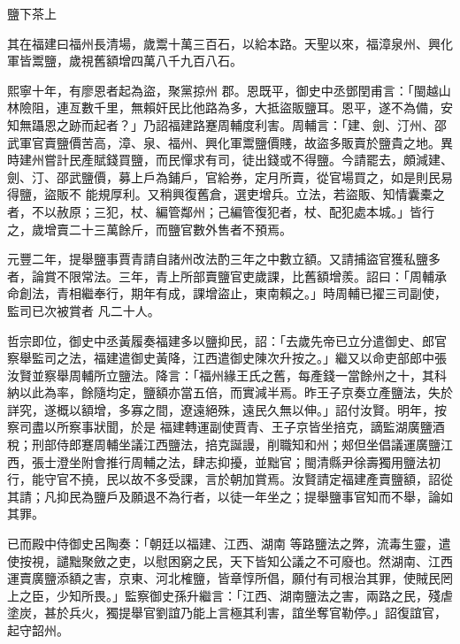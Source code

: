 
\begin{pinyinscope}

 鹽下茶上



 其在福建曰福州長清場，歲鬻十萬三百石，以給本路。天聖以來，福漳泉州、興化軍皆鬻鹽，歲視舊額增四萬八千九百八石。



 熙寧十年，有廖恩者起為盜，聚黨掠州
 郡。恩既平，御史中丞鄧閏甫言：「閩越山林險阻，連亙數千里，無賴奸民比他路為多，大抵盜販鹽耳。恩平，遂不為備，安知無躡恩之跡而起者？」乃詔福建路蹇周輔度利害。周輔言：「建、劍、汀州、邵武軍官賣鹽價苦高，漳、泉、福州、興化軍鬻鹽價賤，故盜多販賣於鹽貴之地。異時建州嘗計民產賦錢買鹽，而民憚求有司，徒出錢或不得鹽。今請罷去，頗減建、劍、汀、邵武鹽價，募上戶為鋪戶，官給券，定月所賣，從官場買之，如是則民易得鹽，盜販不
 能規厚利。又稍興復舊倉，選吏增兵。立法，若盜販、知情囊橐之者，不以赦原；三犯，杖、編管鄰州；己編管復犯者，杖、配犯處本城。」皆行之，歲增賣二十三萬餘斤，而鹽官數外售者不預焉。



 元豐二年，提舉鹽事賈青請自諸州改法酌三年之中數立額。又請捕盜官獲私鹽多者，論賞不限常法。三年，青上所部賣鹽官吏歲課，比舊額增羨。詔曰：「周輔承命創法，青相繼奉行，期年有成，課增盜止，東南賴之。」時周輔已擢三司副使，監司已次被賞者
 凡二十人。



 哲宗即位，御史中丞黃履奏福建多以鹽抑民，詔：「去歲先帝已立分遣御史、郎官察舉監司之法，福建遣御史黃降，江西遣御史陳次升按之。」繼又以命吏部郎中張汝賢並察舉周輔所立鹽法。降言：「福州緣王氏之舊，每產錢一當餘州之十，其科納以此為率，餘隨均定，鹽額亦當五倍，而實減半焉。昨王子京奏立產鹽法，失於詳究，遂概以額增，多寡之間，遼遠絕殊，遠民久無以伸。」詔付汝賢。明年，按察司盡以所察事狀聞，於是
 福建轉運副使賈青、王子京皆坐掊克，謫監湖廣鹽酒稅；刑部侍郎蹇周輔坐議江西鹽法，掊克誕謾，削職知和州；郟但坐倡議運廣鹽江西，張士澄坐附會推行周輔之法，肆志抑擾，並黜官；閩清縣尹徐壽獨用鹽法初行，能守官不撓，民以故不多受課，言於朝加賞焉。汝賢請定福建產賣鹽額，詔從其請；凡抑民為鹽戶及願退不為行者，以徒一年坐之；提舉鹽事官知而不舉，論如其罪。



 已而殿中侍御史呂陶奏：「朝廷以福建、江西、湖南
 等路鹽法之弊，流毒生靈，遣使按視，譴黜聚斂之吏，以慰困窮之民，天下皆知公議之不可廢也。然湖南、江西運賣廣鹽添額之害，京東、河北榷鹽，皆章惇所倡，願付有司根治其罪，使賊民罔上之臣，少知所畏。」監察御史孫升繼言：「江西、湖南鹽法之害，兩路之民，殘虐塗炭，甚於兵火，獨提舉官劉誼乃能上言極其利害，誼坐奪官勒停。」詔復誼官，起守韶州。




\end{pinyinscope}
